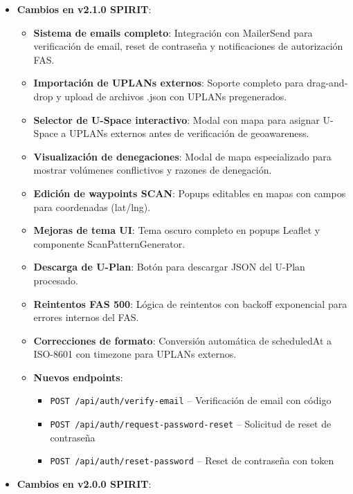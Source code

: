 \documentclass[12pt,a4paper]{article}
\begin{document}
\begin{itemize}
\begin{itemize}
        \item \textbf{Nuevos endpoints (Sprint 4)}: \texttt{GET/POST /api/user/drafts}, \texttt{GET/PATCH/DELETE /api/user/drafts/[id]}.
    \end{itemize}
    \item \textbf{Cambios en v2.1.0 SPIRIT}:
    \begin{itemize}
        \item \textbf{Sistema de emails completo}: Integración con MailerSend para verificación de email, reset de contraseña y notificaciones de autorización FAS.
        \item \textbf{Importación de UPLANs externos}: Soporte completo para drag-and-drop y upload de archivos .json con UPLANs pregenerados.
        \item \textbf{Selector de U-Space interactivo}: Modal con mapa para asignar U-Space a UPLANs externos antes de verificación de geoawareness.
        \item \textbf{Visualización de denegaciones}: Modal de mapa especializado para mostrar volúmenes conflictivos y razones de denegación.
        \item \textbf{Edición de waypoints SCAN}: Popups editables en mapas con campos para coordenadas (lat/lng).
        \item \textbf{Mejoras de tema UI}: Tema oscuro completo en popups Leaflet y componente ScanPatternGenerator.
        \item \textbf{Descarga de U-Plan}: Botón para descargar JSON del U-Plan procesado.
        \item \textbf{Reintentos FAS 500}: Lógica de reintentos con backoff exponencial para errores internos del FAS.
        \item \textbf{Correcciones de formato}: Conversión automática de scheduledAt a ISO-8601 con timezone para UPLANs externos.
        \item \textbf{Nuevos endpoints}:
        \begin{itemize}
            \item \texttt{POST /api/auth/verify-email} -- Verificación de email con código
            \item \texttt{POST /api/auth/request-password-reset} -- Solicitud de reset de contraseña
            \item \texttt{POST /api/auth/reset-password} -- Reset de contraseña con token
        \end{itemize}
    \end{itemize}
    \item \textbf{Cambios en v2.0.0 SPIRIT}:

\end{itemize}
\end{document}
